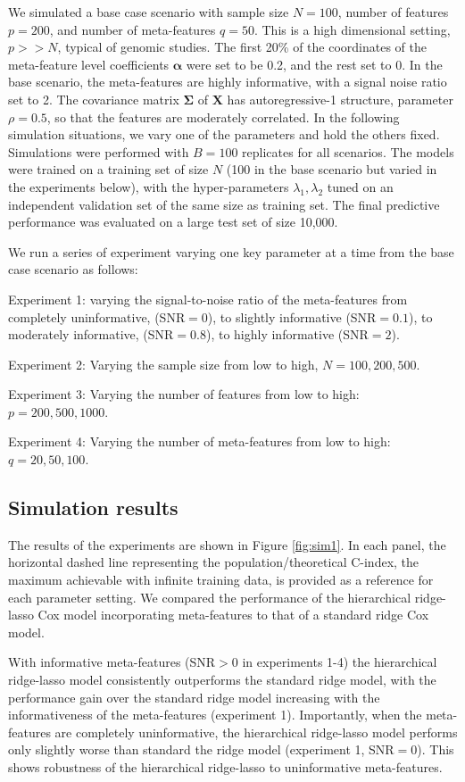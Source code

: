 We simulated a base case scenario with sample size $N=100$, number of features $p=200$, and number of meta-features $q=50$. This is a high dimensional setting, $p>>N$, typical of genomic studies. The first 20\% of the coordinates of the meta-feature level coefficients $\bm{\alpha}$ were set to be 0.2, and the rest set to 0. In the base scenario, the meta-features are highly informative, with a signal noise ratio set to 2. The covariance matrix $\bm{\Sigma}$ of $\bm{X}$ has autoregressive-1 structure, parameter $\rho=0.5$, so that the features are moderately correlated. In the following simulation situations, we vary one of the parameters and hold the others fixed. Simulations were performed with $B=100$ replicates for all scenarios. The models were trained on a training set of size $N$ (100 in the base scenario but varied in the experiments below), with the hyper-parameters $\lambda_1,\lambda_2$ tuned on an independent validation set of the same size as training set. The final predictive performance was evaluated on a large test set of size 10,000.

We run a series of experiment varying one key parameter at a time from the base case scenario as follows:

Experiment 1: varying the signal-to-noise ratio of the meta-features from completely uninformative, (SNR$=0$), to slightly informative (SNR$=0.1$), to moderately informative, (SNR$=0.8$), to highly informative (SNR$=2$).

Experiment 2: Varying the sample size from low to high, $N=100,200,500$.

Experiment 3: Varying the number of features from low to high: $p=200,500,1000$.

Experiment 4: Varying the number of meta-features from low to high: $q=20,50,100$.

\subsection{Simulation results}
The results of the experiments are shown in Figure \ref{fig:sim1}. In each panel, the horizontal dashed line representing the population/theoretical C-index, the maximum achievable with infinite training data, is provided as a reference for each parameter setting. We compared the performance of the hierarchical ridge-lasso Cox model incorporating meta-features to that of a standard ridge Cox model.

With informative meta-features (SNR$>0$ in experiments 1-4) the hierarchical ridge-lasso model consistently outperforms the standard ridge model, with the performance gain over the standard ridge model increasing with the informativeness of the meta-features (experiment 1). Importantly, when the meta-features are completely uninformative, the hierarchical ridge-lasso model performs only slightly worse than standard the ridge model (experiment 1, SNR$=0$). This shows robustness of the hierarchical ridge-lasso to uninformative meta-features.

